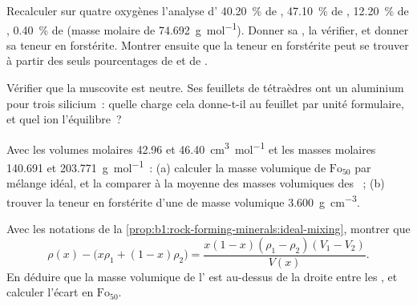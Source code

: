 \begin{exercise}[$\star\star$]\label{exo:b1:rock-forming-minerals:7}
Recalculer sur quatre oxygènes l'analyse d' \qty{40.20}{\percent}
de , \qty{47.10}{\percent} de , \qty{12.20}{\percent} de ,
\qty{0.40}{\percent} de  (masse molaire de 
\qty{74.692}{g.mol^{-1}}).
Donner sa , la vérifier, et donner sa teneur en forstérite.
Montrer ensuite que la teneur en forstérite peut se trouver à partir des seuls
pourcentages de  et de .
\end{exercise}

\begin{exercise}[$\star\star$]\label{exo:b1:rock-forming-minerals:8}
Vérifier que la muscovite  est neutre. Ses feuillets de
tétraèdres ont un aluminium pour trois silicium~: quelle charge cela donne-t-il
au feuillet par unité formulaire, et quel ion l'équilibre~?
\end{exercise}

\begin{exercise}[$\star\star$]\label{exo:b1:rock-forming-minerals:9}
Avec les volumes molaires \num{42.96} et \qty{46.40}{cm^3.mol^{-1}} et les
masses molaires \num{140.691} et \qty{203.771}{g.mol^{-1}}~: (a) calculer la
masse volumique de $\text{Fo}_{50}$ par mélange idéal, et la comparer à la
moyenne des masses volumiques des ~; (b) trouver la teneur en
forstérite d'une  de masse volumique \qty{3.600}{g.cm^{-3}}.
\end{exercise}

\begin{exercise}[$\star\star\star$]\label{exo:b1:rock-forming-minerals:10}
Avec les notations de la \cref{prop:b1:rock-forming-minerals:ideal-mixing},
montrer que
\[
  \rho(x) - \bigl(x\rho_1 + (1 - x)\rho_2\bigr) =
  \frac{x(1 - x)(\rho_1 - \rho_2)(V_1 - V_2)}{V(x)} .
\]
En déduire que la masse volumique de l' est au-dessus de la droite entre
les , et calculer l'écart en $\text{Fo}_{50}$.
\end{exercise}

